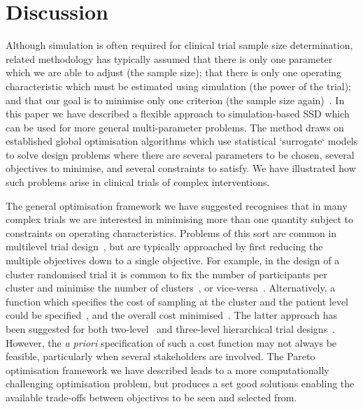 \documentclass{article} %
\begin{document}
\section{Discussion}\label{sec:discussion}

Although simulation is often required for clinical trial sample size determination, related methodology has typically assumed that there is only one parameter which we are able to adjust (the sample size); that there is only one operating characteristic which must be estimated using simulation (the power of the trial); and that our goal is to minimise only one criterion (the sample size again)~\cite{Landau2013, Hooper2013}. In this paper we have described a flexible approach to simulation-based SSD which can be used for more general multi-parameter problems. The method draws on established global optimisation algorithms which use statistical `surrogate` models to solve design problems where there are several parameters to be chosen, several objectives to minimise, and several constraints to satisfy. We have illustrated how such problems arise in clinical trials of complex interventions.

The general optimisation framework we have suggested recognises that in many complex trials we are interested in minimising more than one quantity subject to constraints on operating characteristics. Problems of this sort are common in multilevel trial design~\cite{Hemming2017}, but are typically approached by first reducing the multiple objectives down to a single objective. For example, in the design of a cluster randomised trial it is common to fix the number of participants per cluster and minimise the number of clusters~\cite{Donner2000}, or vice-versa~\cite{Hemming2011, Eldridge2015}. Alternatively, a function which specifies the cost of sampling at the cluster and the patient level could be specified~\cite[p. 175]{Hox2002}, and the overall cost minimised~\cite{Snijders1993}. The latter approach has been suggested for both two-level~\cite{Raudenbush2000} and three-level hierarchical trial designs~\cite{Breukelen2012, Teerenstra2008}. However, the \emph{a priori} specification of such a cost function may not always be feasible, particularly when several stakeholders are involved. The Pareto optimisation framework we have described leads to a more computationally challenging optimisation problem, but produces a set good solutions enabling the available trade-offs between objectives to be seen and selected from. 
\end{document}
